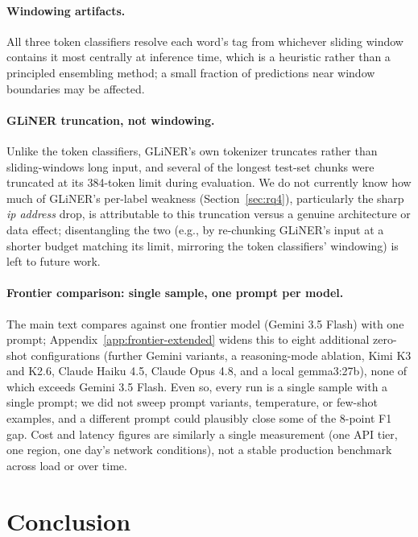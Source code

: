 \documentclass[11pt]{article}
\begin{document}
\paragraph{Windowing artifacts.} All three token classifiers resolve each
word's tag from whichever sliding window contains it most centrally at
inference time, which is a heuristic rather than a principled ensembling
method; a small fraction of predictions near window boundaries may be
affected.

\paragraph{GLiNER truncation, not windowing.} Unlike the token classifiers,
GLiNER's own tokenizer truncates rather than sliding-windows long input,
and several of the longest test-set chunks were truncated at its 384-token
limit during evaluation. We do not currently know how much of GLiNER's
per-label weakness (Section~\ref{sec:rq4}), particularly the sharp \emph{ip
address} drop, is attributable to this truncation versus a genuine
architecture or data effect; disentangling the two (e.g., by re-chunking
GLiNER's input at a shorter budget matching its limit, mirroring the token
classifiers' windowing) is left to future work.

\paragraph{Frontier comparison: single sample, one prompt per model.}
The main text compares against one frontier model (Gemini 3.5 Flash) with
one prompt; Appendix~\ref{app:frontier-extended} widens this to eight
additional zero-shot configurations (further Gemini variants, a
reasoning-mode ablation, Kimi K3 and K2.6, Claude Haiku 4.5, Claude Opus
4.8, and a local gemma3:27b), none of which exceeds Gemini 3.5 Flash. Even so, every run
is a single sample with a single prompt; we did not sweep prompt
variants, temperature, or few-shot examples, and a different prompt could
plausibly close some of the 8-point F1 gap. Cost and latency figures are
similarly a single measurement (one API tier, one region, one day's
network conditions), not a stable production benchmark across load or
over time.

\section{Conclusion}
\end{document}

